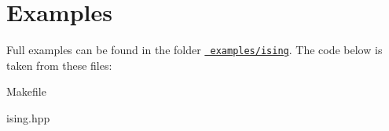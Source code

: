 \chapter{Examples}
\hypertarget{examples}{}\label{examples}
Full examples can be found in the folder \href{../examples/ising/}{\texttt{ examples/ising}}. The code below is taken from these files\+:


\begin{DoxyItemize}
\item Makefile
\end{DoxyItemize}


\begin{DoxyCodeInclude}{0}
\DoxyCodeLine{}

\end{DoxyCodeInclude}



\begin{DoxyItemize}
\item ising.\+hpp
\end{DoxyItemize}


